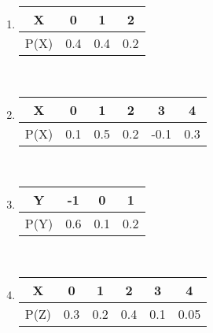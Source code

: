 \begin{enumerate}
	\item \begin{tabular}{|c|c|c|c|} 
   \hline
   X & 0 & 1 & 2 \\
   \hline
   P(X) & 0.4 & 0.4 & 0.2 \\
   \hline
  \end{tabular}
  \\
   \item \begin{tabular}{|c|c|c|c|c|c|} 
   \hline
   X & 0 & 1 & 2 & 3 & 4 
   \\
   \hline
   P(X) & 0.1 & 0.5 & 0.2 & -0.1 & 0.3 
   \\
   \hline
  \end{tabular}
  \\
    \item \begin{tabular}{|c|c|c|c|} 
   \hline
   Y & -1 & 0 & 1 \\ 
   \hline
   P(Y) & 0.6 & 0.1 & 0.2 \\ 
   \hline
   \end{tabular}
   \\
  \item \begin{tabular}{|c|c|c|c|c|c|} 
   \hline
   X & 0 & 1 & 2 & 3 & 4 \\ 
   \hline
   P(Z) & 0.3 & 0.2 & 0.4 & 0.1 & 0.05 \\ 
   \hline
   \end{tabular}
  \end{enumerate}